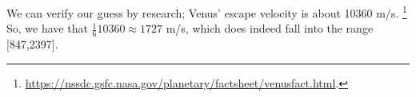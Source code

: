 \documentclass[../astro_4]{subfiles}
\begin{document}
We can verify our guess by research; Venus' escape velocity is about 10360 m/s.
\footnote{\url{https://nssdc.gsfc.nasa.gov/planetary/factsheet/venusfact.html}.}
So, we have that $\frac{1}{6}10360\approx 1727$ m/s, which does indeed fall into the range [847,2397].

\end{document}
